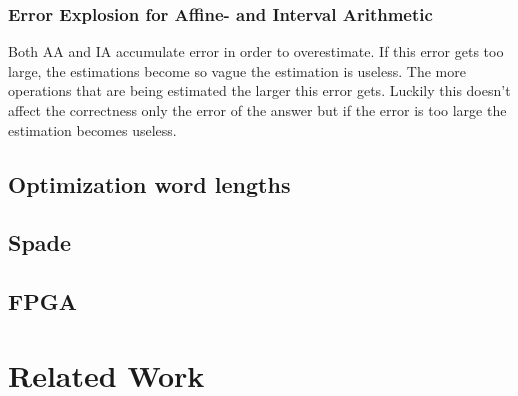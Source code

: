 \documentclass[msc,lith,english]{liuthesis}
\begin{document}
\subsection{Error Explosion for Affine- and Interval Arithmetic }

Both AA and IA accumulate error in order to overestimate. If this error gets too large, the estimations become so vague the estimation is useless. The more operations that are being estimated the larger this error gets. Luckily this doesn't affect the correctness only the error of the answer but if the error is too large the estimation becomes useless.

\cite{src:affAri}


\section{Optimization word lengths}

\section{Spade}

\section{FPGA}


\chapter{Related Work}

% 
\end{document}
